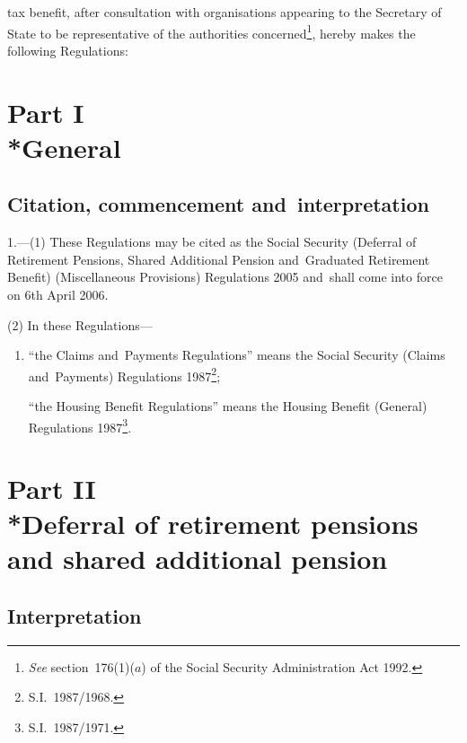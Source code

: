 \documentclass[12pt,a4paper]{article}
\begin{document}
tax benefit, after consultation with organisations appearing to the Secretary of State to be representative of the authorities concerned\footnote{\emph{See} section~176(1)($a$) of the Social Security Administration Act 1992.}, hereby makes the following Regulations: 

{\sloppy

\tableofcontents

}

\bigskip

\setcounter{secnumdepth}{-2}

\section[Part I --- General]{Part I\\*General}

\renewcommand\parthead{--- Part I}

\subsection[1. Citation, commencement and~interpretation]{Citation, commencement and~interpretation}

1.---(1)  These Regulations may be cited as the Social Security (Deferral of Retirement Pensions, Shared Additional Pension and~Graduated Retirement Benefit) (Miscellaneous Provisions) Regulations 2005 and~shall come into force on 6th April 2006.

(2) In these Regulations—
\begin{enumerate}\item[]
“the Claims and~Payments Regulations” means the Social Security (Claims and~Payments) Regulations 1987\footnote{S.I.~1987/1968.};

“the Housing Benefit Regulations” means the Housing Benefit (General) Regulations 1987\footnote{S.I.~1987/1971.}.
\end{enumerate}

\section[Part II --- Deferral of retirement pensions and shared additional pension]{Part II\\*Deferral of retirement pensions and shared additional pension}

\renewcommand\parthead{--- Part II}

\subsection[2. Interpretation]{Interpretation}
\end{document}
